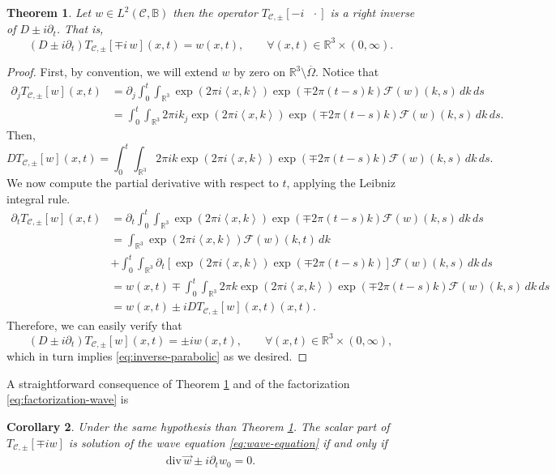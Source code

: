 \documentclass[12pt]{article}
\newtheorem{theorem}{Theorem}
\newtheorem{corollary}[theorem]{Corollary}
\def\R{\mathbb{R}}
\def\div{\mbox{div}\,}
\def\B{\mathbb{B}}
\def\R{\mathbb{R}}
\newcommand{\inner}[1]{\left\langle #1 \right\rangle}
\newcommand{\fourier}[1]{\mathcal{F}\left( #1 \right)}
\newcommand{\expo}[1]{\exp\left( #1\right)}
\begin{document}
\begin{theorem}\label{th:right-inverse}
    Let $w\in L^2(\mathscr{C},\B)$ then the operator $T_{\mathscr{C},\pm}[-i\text{ } \cdot]$ is a right inverse of $D\pm i\partial_t$. That is,
    \begin{equation}\label{eq:inverse-parabolic}
        (D\pm i\partial_t) T_{\mathscr{C},\pm}[\mp i \,w](x,t)= w(x,t), \qquad\forall (x,t)\in\R^3\times (0,\infty).
    \end{equation}
\end{theorem}
\begin{proof}
First, by convention, we will extend $w$ by zero on $\mathbb{R}^3\setminus \overline{\Omega}$. Notice that
    \begin{align*}
        \partial_jT_{\mathscr{C},\pm}[w](x,t)&=\partial_j\int_0^t\int_{\R^3}\expo{2\pi i\inner{x,k}}\expo{\mp2\pi(t-s)k}\fourier{w}(k,s)\, dk\, ds\\
        &=\int_0^t\int_{\R^3}2\pi ik_j\expo{2\pi i\inner{x,k}}\expo{\mp 2\pi(t-s)k}\fourier{w}(k,s)\, dk\, ds.
    \end{align*}
    Then,
    \[DT_{\mathscr{C},\pm}[w](x,t)=\int_0^t\int_{\R^3}2\pi ik\expo{2\pi i\inner{x,k}}\expo{\mp 2\pi(t-s)k}\fourier{w}(k,s)\, dk\,ds.\]
    We now compute the partial derivative with respect to $t$, applying the Leibniz integral rule.
    \begin{align*}
        \partial_t T_{\mathscr{C},\pm}[w](x,t)&=\partial_t\int_0^t\int_{\R^3}\expo{2\pi i\inner{x,k}}\expo{\mp 2\pi(t-s)k}\fourier{w}(k,s)\,dk\,ds\\
        &=\int_{\R^3}\expo{2\pi i\inner{x,k}}\fourier{w}(k,t)\, dk\\   &+\int_0^t\int_{\R^3}\partial_t\left[\expo{2\pi i\inner{x,k}}\expo{\mp 2\pi(t-s)k}\right]\fourier{w}(k,s)\, dk\,ds\\
        &=
        w(x,t)\mp \int_0^t\int_{\R^3}2\pi k\expo{2\pi i\inner{x,k}}\expo{\mp 2\pi(t-s)k}\fourier{w}(k,s)\,dk\, ds\\
        &=w(x,t)\pm iD T_{\mathscr{C},\pm}[w](x,t)(x,t).
    \end{align*}
    Therefore, we can easily verify that 
    $$(D\pm i\partial_t)T_{\mathscr{C},\pm}[w](x,t)=\pm iw(x,t), \qquad \forall (x,t)\in \R^3\times (0,\infty),$$
which in turn implies \eqref{eq:inverse-parabolic} as we desired.
\end{proof}
A straightforward consequence of Theorem \ref{th:right-inverse} and of the factorization \eqref{eq:factorization-wave} is 
\begin{corollary}\label{cor:compatibilty}
Under the same hypothesis than Theorem \ref{th:right-inverse}. The scalar part of $T_{\mathscr{C},\pm}[{\mp iw}]$ is solution of the wave equation \eqref{eq:wave-equation} if and only if 
\begin{align}\label{eq:compatibility-condition}
\div \vec w\pm i\partial_tw_0=0. 
\end{align}
\end{corollary}
\end{document}
